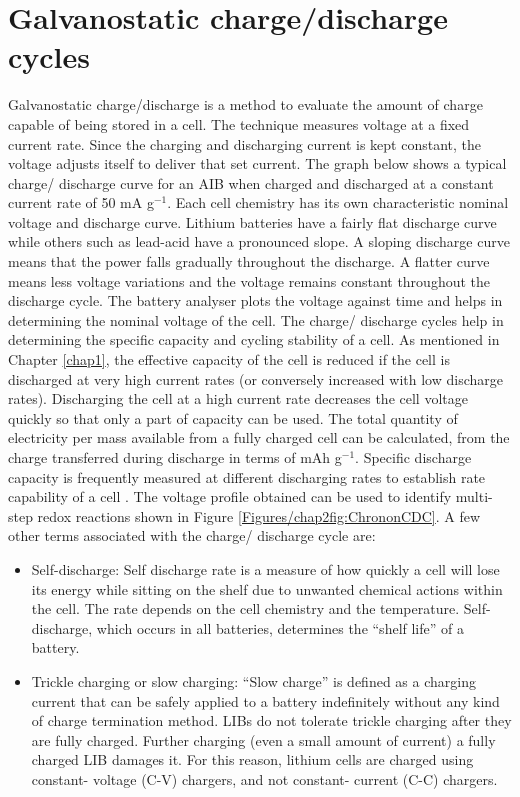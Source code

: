 \section{Galvanostatic charge/discharge cycles}
Galvanostatic charge/discharge is a method to evaluate the amount of charge capable of being stored in a cell. The technique measures voltage at a fixed current rate. Since the charging and discharging current is kept constant, the voltage adjusts itself to deliver that set current. The graph below shows a typical charge/ discharge curve for an AIB when charged and discharged at a constant current rate of 50 mA g$^{-1}$. Each cell chemistry has its own characteristic nominal voltage and discharge curve. Lithium batteries have a fairly flat discharge curve while others such as lead-acid have a pronounced slope. A sloping discharge curve means that the power falls gradually throughout the discharge. A flatter curve means less voltage variations and the voltage remains constant throughout the discharge cycle. The battery analyser plots the voltage against time and helps in determining the nominal voltage of the cell. The charge/ discharge cycles help in determining the specific capacity and cycling stability of a cell. As mentioned in Chapter \ref{chap1}, the effective capacity of the cell is reduced if the cell is discharged at very high current rates (or conversely increased with low discharge rates). Discharging the cell at a high current rate decreases the cell voltage quickly so that only a part of capacity can be used. The total quantity of electricity per mass available from a fully charged cell can be calculated, from the charge transferred during discharge in terms of mAh g$^{-1}$. Specific discharge capacity is frequently measured at different discharging rates to establish rate capability of a cell \cite{pyun_electrochemistry_2012-2}. The voltage profile obtained can be used to identify multi-step redox reactions shown in Figure \ref{Figures/chap2fig:ChrononCDC}. A few other terms associated with the charge/ discharge cycle are:
\begin{itemize}
\item Self-discharge: Self discharge rate is a measure of how quickly a cell will lose its energy while sitting on the shelf due to unwanted chemical actions within the cell. The rate depends on the cell chemistry and the temperature. Self-discharge, which occurs in all batteries, determines the \enquote{shelf life} of a battery.
\item Trickle charging or slow charging: \enquote{Slow charge} is defined as a charging current that can be safely applied to a battery indefinitely without any kind of charge termination method. LIBs do not tolerate trickle charging after they are fully charged. Further charging (even a small amount of current) a fully charged LIB damages it. For this reason, lithium cells are charged using constant- voltage (C-V) chargers, and not constant- current (C-C) chargers.

\end{itemize}

